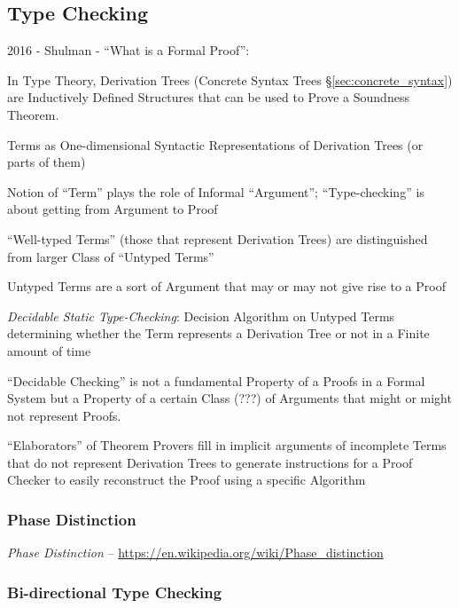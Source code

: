 \subsection{Type Checking}\label{sec:type_checking}

2016 - Shulman - ``What is a Formal Proof'': %

In Type Theory, Derivation Trees (Concrete Syntax Trees
\S\ref{sec:concrete_syntax}) are Inductively Defined Structures that
can be used to Prove a Soundness Theorem.

Terms as One-dimensional Syntactic Representations of Derivation Trees
(or parts of them)

Notion of ``Term'' plays the role of Informal ``Argument'';
``Type-checking'' is about getting from Argument to Proof

``Well-typed Terms'' (those that represent Derivation Trees) are
distinguished from larger Class of ``Untyped Terms''

Untyped Terms are a sort of Argument that may or may not give rise to
a Proof

\emph{Decidable Static Type-Checking}: Decision Algorithm on Untyped
Terms determining whether the Term represents a Derivation Tree or not
in a Finite amount of time

``Decidable Checking'' is not a fundamental Property of a Proofs in a
Formal System but a Property of a certain Class (???) of Arguments
that might or might not represent Proofs.

``Elaborators'' of Theorem Provers fill in implicit arguments of
incomplete Terms that do not represent Derivation Trees to generate
instructions for a Proof Checker to easily reconstruct the Proof using
a specific Algorithm



\subsubsection{Phase Distinction}\label{sec:phase_distinction}

\emph{Phase Distinction} --
\url{https://en.wikipedia.org/wiki/Phase_distinction}



\subsubsection{Bi-directional Type Checking}
\label{sec:bidirectional_checking}


